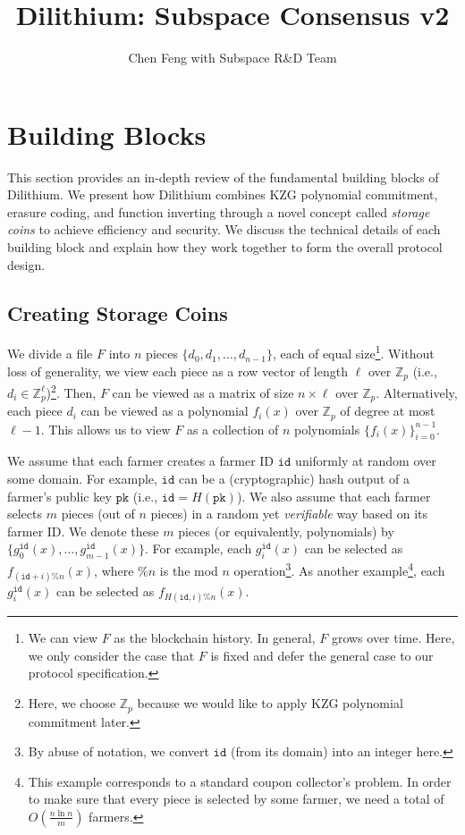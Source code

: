\documentclass[12pt,draftcls,onecolumn]{IEEEtran}
\title{Dilithium: Subspace Consensus v2}
\author{Chen Feng with Subspace R\&D Team}
\newcommand{\Fp}{\mathbb{Z}_p}
\newcommand{\pk}{\texttt{pk}}
\newcommand{\id}{\texttt{id}}
\begin{document}
\maketitle


\section{Building Blocks}

This section provides an in-depth review of the fundamental building blocks of Dilithium.
We present how Dilithium combines KZG polynomial commitment, erasure coding, and function inverting through a novel concept called \emph{storage coins} to achieve efficiency and security. We discuss the technical details of each building block and explain how they work together to form the overall protocol design. 

\subsection{Creating Storage Coins}

We divide a file $F$ into $n$ pieces $\{ d_0, d_1, \ldots, d_{n-1}\}$, each of equal size\footnote{We can view $F$ as the blockchain history. In general, $F$ grows over time. Here, we only consider the case that $F$ is fixed and defer the general case to our protocol specification.}. 
Without loss of generality, we view each piece as a row vector of length $\ell$ over $\Fp$  (i.e., $d_i \in \Fp^\ell$)\footnote{Here, we choose $\Fp$ because we would like to apply KZG polynomial commitment later.}.
Then, $F$ can be viewed as a matrix of size $n \times \ell$ over $\Fp$.
Alternatively, each piece $d_i$ can be viewed as a polynomial $f_i(x)$ over $\Fp$ of degree at most $\ell - 1$. 
This allows us to view $F$ as a collection of $n$ polynomials $\{ f_i(x) \}_{i = 0}^{n-1}$. 

We assume that each farmer creates a farmer ID $\id$ uniformly at random over some domain. For example, $\id$ can be a (cryptographic) hash output of a farmer's public key $\pk$ (i.e., $\id = H(\pk)$).
We also assume that each farmer selects $m$ pieces (out of $n$ pieces) in a random yet \emph{verifiable} way based on its farmer ID.
We denote these $m$ pieces (or equivalently, polynomials) by $\{g_0^{\id}(x), \ldots, g_{m-1}^{\id}(x) \}$.
For example, each $g_i^{\id}(x)$ can be selected as $f_{(\id + i)\% n}(x)$, where $\% n$ is the mod $n$ operation\footnote{By abuse of notation, we convert $\id$ (from its domain) into an integer here.}.
As another example\footnote{This example corresponds to a standard coupon collector's problem. In order to make sure that every piece is selected by some farmer, we need a total of $O\left( \frac{n \ln n}{m} \right)$ farmers.}, each $g_i^{\id}(x)$ can be selected as $f_{H(\id, i)\% n}(x)$.
\end{document}
